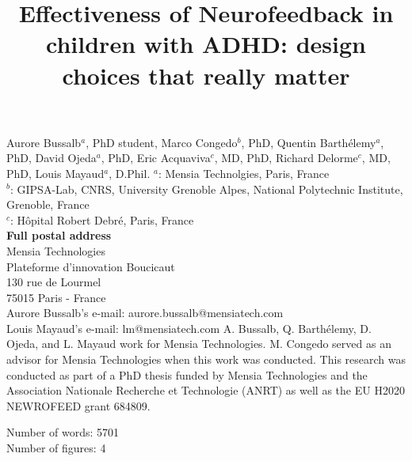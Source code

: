 

\title{Effectiveness of Neurofeedback in children with ADHD: design choices that really matter} %
\maketitle
\noindent Aurore Bussalb$^a$, PhD student, Marco Congedo$^b$, PhD, Quentin Barth\'elemy$^a$, PhD, David Ojeda$^a$, PhD, 
Eric Acquaviva$^c$, MD, PhD, Richard Delorme$^c$, MD, PhD, Louis Mayaud$^a$, D.Phil. 
\smallbreak
\noindent $^a$: Mensia Technolgies, Paris, France \\
\noindent $^b$: GIPSA-Lab, CNRS, University Grenoble Alpes, National Polytechnic Institute, Grenoble, France \\
\noindent $^c$: Hôpital Robert Debré, Paris, France \\ 
\smallbreak
\noindent\textbf{Full postal address} \\
Mensia Technologies \\
Plateforme d'innovation Boucicaut \\
130 rue de Lourmel \\
75015 Paris - France \\
Aurore Bussalb's e-mail: aurore.bussalb@mensiatech.com \\
Louis Mayaud's e-mail: lm@mensiatech.com 
\smallbreak
A. Bussalb, Q. Barth\'elemy, D. Ojeda, and L. Mayaud work for Mensia Technologies.
M. Congedo served as an advisor for Mensia Technologies when this work was conducted. 
\smallbreak
This research was conducted as part of a PhD thesis funded by Mensia Technologies and the Association Nationale 
Recherche et Technologie (ANRT) as well as the EU H2020 NEWROFEED grant 684809.

\noindent Number of words: 5701 \\
\noindent Number of figures: 4 
